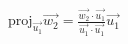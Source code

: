 \documentclass[preview]{standalone}
\begin{document}
\begin{align*}
\text{proj}_{\vec{u_1}} \vec{w_2} = \frac{\vec{w_2} \cdot \vec{u_1}}{\vec{u_1} \cdot \vec{u_1}} \vec{u_1}
\end{align*}
\end{document}
